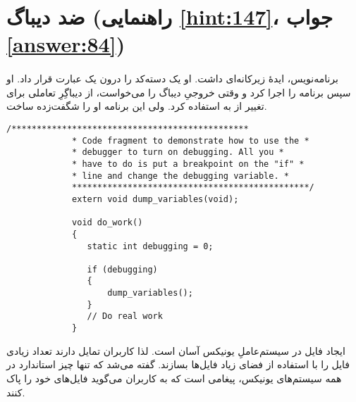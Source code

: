 \section[ضد دیباگ]{ضد دیباگ \protect{} (راهنمایی \ref{hint:147}، جواب \ref{answer:84})}
\paragraph{}\label{prog:98}
برنامه‌نویس، ایدهٔ زیرکانه‌ای داشت. او یک دسته‌کد را درون یک عبارت  قرار داد. او سپس برنامه را اجرا کرد و وقتی خروجیِ دیباگ را می‌خواست، از دیباگِرِ تعاملی برای تغییر  از  به  استفاده کرد. ولی این برنامه او را شگفت‌زده ساخت.

\begin{LTR}
        \begin{lstlisting}[style=C++Style]
             /***********************************************
             * Code fragment to demonstrate how to use the *
             * debugger to turn on debugging. All you *
             * have to do is put a breakpoint on the "if" *
             * line and change the debugging variable. *
             ***********************************************/
             extern void dump_variables(void);

             void do_work()
             {
             	static int debugging = 0;

            	if (debugging)
             	{
             		dump_variables();
             	}
             	// Do real work
             }
        \end{lstlisting}
\end{LTR}

\begin{tcolorbox}
    ایجاد فایل در سیستم‌عاملِ یونیکس آسان است. لذا کاربران تمایل دارند تعداد زیادی فایل را با استفاده از فضای زیاد فایل‌ها بسازند. گفته می‌شد که تنها چیز استاندارد در همه سیستم‌های یونیکس، پیغامی است که به کاربران می‌گوید فایل‌های خود را پاک کنند.
    \LTR
\end{tcolorbox}